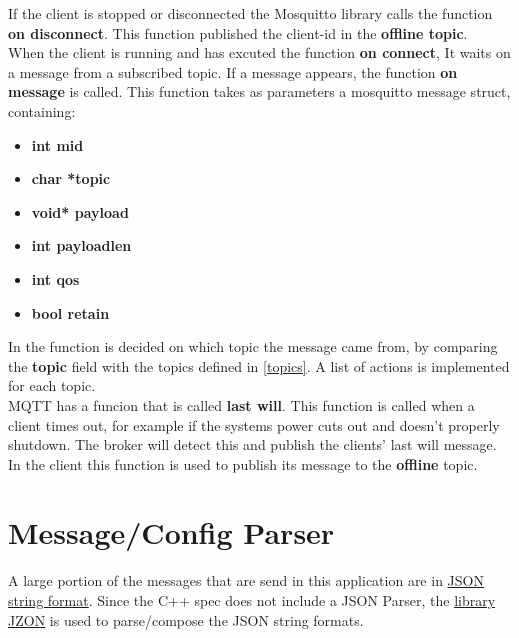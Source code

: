 If the client is stopped or disconnected the Mosquitto library calls the function \textbf {on disconnect}. This function published the client-id in the \textbf {offline topic}.\\

When the client is running and has excuted the function \textbf {on connect}, It waits on a message from a subscribed topic. If a message appears, the function \textbf {on message} is called. This function takes as parameters a mosquitto message struct, containing:
\small{
\begin{itemize} [noitemsep, nolistsep]
	\item \textbf {int mid}
	\item \textbf {char *topic}
	\item \textbf {void* payload}
	\item \textbf {int payloadlen}
	\item \textbf {int qos}
	\item \textbf {bool retain\\}
\end{itemize}
}

In the function is decided on which topic the message came from, by comparing the \textbf {topic} field with the topics defined in \ref{topics}. A list of actions is implemented for each topic.\\

MQTT has a funcion that is called \textbf {last will}. This function is called when a client times out, for example if the systems power cuts out and doesn't properly shutdown. The broker will detect this and publish the clients' last will message. In the client this function is used to publish its message to the \textbf {offline} topic.

\section{Message/Config Parser}

A large portion of the messages that are send in this application are in \href{http://www.json.org/}{JSON string format}. Since the C++ spec does not include a JSON Parser, the \href{https://github.com/Zguy/Jzon}{library JZON} is used to parse/compose the JSON string formats.\\

